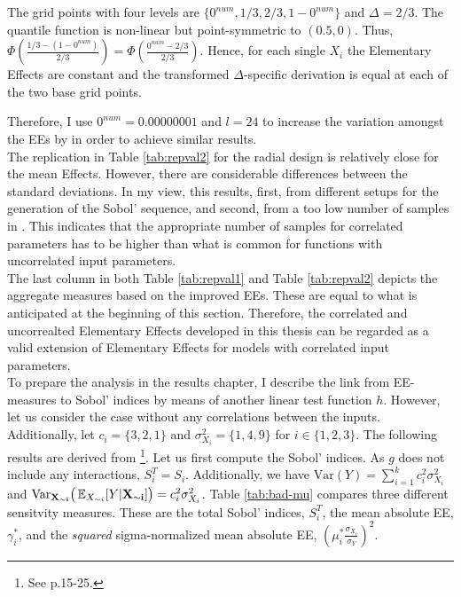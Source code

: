 \noindent
The grid points with four levels are $ \{ 0^{num}, 1/3, 2/3, 1-0^{num} \}$ and $\Delta=2/3$. The quantile function is non-linear but point-symmetric to $(0.5, 0)$. Thus, $\Phi(\frac{1/3 - (1-0^{num})}{2/3}) = \Phi(\frac{0^{num} - 2/3}{2/3})$. Hence, for each single $X_i$ the Elementary Effects are constant and the transformed $\Delta$-specific derivation is equal at each of the two base grid points.

Therefore, I use $0^{num}=0.00000001$ and $l=24$ to increase the variation amongst the EEs by \cite{ge2017extending} in order to achieve similar results.\\

\noindent
The replication in Table \ref{tab:repval2} for the radial design is relatively close for the mean Effects. However, there are considerable differences between the standard deviations. In my view, this results, first, from different setups for the generation of the Sobol' sequence, and second, from a too low number of samples in \cite{ge2017extending}. This indicates that the appropriate number of samples for correlated parameters has to be higher than what is common for functions with uncorrelated input parameters.\\

\noindent
The last column in both Table \ref{tab:repval1} and Table \ref{tab:repval2} depicts the aggregate measures based on the improved EEs. These are equal to what is anticipated at the beginning of this section. Therefore, the correlated and uncorrealted Elementary Effects developed in this thesis can be regarded as a valid extension of Elementary Effects for models with correlated input parameters.\\

\noindent
To prepare the analysis in the results chapter, I describe the link from EE-measures to Sobol' indices by means of another linear test function $h$. However, let us consider the case without any correlations between the inputs. Additionally, let $c_i = \{3,2,1\}$ and $\sigma^2_{X_i}=\{1,4,9\}$ for $i \in \{1,2,3\}$. The following results are derived from \cite{Saltelli.2008}\footnote{See p.15-25.}. Let us first compute the Sobol' indices. As $g$ does not include any interactions, $S_i^T = S_i$. Additionally, we have $\text{Var}(Y)=\sum_{i=1}^k c_i^2 \sigma_{X_i}^2$ and $\text{Var}_{\bold{X_{\sim i}}}\big( \operatorname*{\mathbb{E}}_{X_{\sim i}}[Y|\bold{X_{\sim i}]} \big) = c_i^2 \sigma_{X_i}^2$. Table \ref{tab:bad-mu} compares three different sensitvity measures. These are the total Sobol' indices, $S_i^T$, the mean absolute EE, $\gamma_i^*$, and the \textit{squared} sigma-normalized mean absolute EE, $(\mu_i^* \frac{\sigma_{X_i}}{\sigma_Y})^2$.\\

